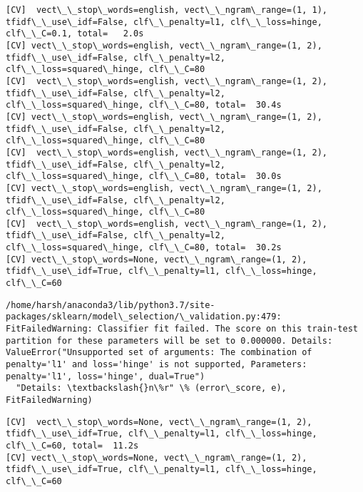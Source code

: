 \documentclass[11pt]{article}
\begin{document}
    \begin{Verbatim}[commandchars=\\\{\}]
[CV]  vect\_\_stop\_words=english, vect\_\_ngram\_range=(1, 1), tfidf\_\_use\_idf=False, clf\_\_penalty=l1, clf\_\_loss=hinge, clf\_\_C=0.1, total=   2.0s
[CV] vect\_\_stop\_words=english, vect\_\_ngram\_range=(1, 2), tfidf\_\_use\_idf=False, clf\_\_penalty=l2, clf\_\_loss=squared\_hinge, clf\_\_C=80 
[CV]  vect\_\_stop\_words=english, vect\_\_ngram\_range=(1, 2), tfidf\_\_use\_idf=False, clf\_\_penalty=l2, clf\_\_loss=squared\_hinge, clf\_\_C=80, total=  30.4s
[CV] vect\_\_stop\_words=english, vect\_\_ngram\_range=(1, 2), tfidf\_\_use\_idf=False, clf\_\_penalty=l2, clf\_\_loss=squared\_hinge, clf\_\_C=80 
[CV]  vect\_\_stop\_words=english, vect\_\_ngram\_range=(1, 2), tfidf\_\_use\_idf=False, clf\_\_penalty=l2, clf\_\_loss=squared\_hinge, clf\_\_C=80, total=  30.0s
[CV] vect\_\_stop\_words=english, vect\_\_ngram\_range=(1, 2), tfidf\_\_use\_idf=False, clf\_\_penalty=l2, clf\_\_loss=squared\_hinge, clf\_\_C=80 
[CV]  vect\_\_stop\_words=english, vect\_\_ngram\_range=(1, 2), tfidf\_\_use\_idf=False, clf\_\_penalty=l2, clf\_\_loss=squared\_hinge, clf\_\_C=80, total=  30.2s
[CV] vect\_\_stop\_words=None, vect\_\_ngram\_range=(1, 2), tfidf\_\_use\_idf=True, clf\_\_penalty=l1, clf\_\_loss=hinge, clf\_\_C=60 

    \end{Verbatim}

    \begin{Verbatim}[commandchars=\\\{\}]
/home/harsh/anaconda3/lib/python3.7/site-packages/sklearn/model\_selection/\_validation.py:479: FitFailedWarning: Classifier fit failed. The score on this train-test partition for these parameters will be set to 0.000000. Details: 
ValueError("Unsupported set of arguments: The combination of penalty='l1' and loss='hinge' is not supported, Parameters: penalty='l1', loss='hinge', dual=True")
  "Details: \textbackslash{}n\%r" \% (error\_score, e), FitFailedWarning)

    \end{Verbatim}

    \begin{Verbatim}[commandchars=\\\{\}]
[CV]  vect\_\_stop\_words=None, vect\_\_ngram\_range=(1, 2), tfidf\_\_use\_idf=True, clf\_\_penalty=l1, clf\_\_loss=hinge, clf\_\_C=60, total=  11.2s
[CV] vect\_\_stop\_words=None, vect\_\_ngram\_range=(1, 2), tfidf\_\_use\_idf=True, clf\_\_penalty=l1, clf\_\_loss=hinge, clf\_\_C=60 

    \end{Verbatim}
\end{document}
